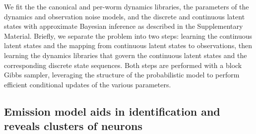 \documentclass[11pt]{article}
\begin{document}
We fit the the canonical and per-worm dynamics libraries, the
parameters of the dynamics and observation noise models, and the
discrete and continuous latent states with approximate Bayesian
inference as described in the Supplementary Material. Briefly, we
separate the problem into two steps: learning the continuous latent
states and the mapping from continuous latent states to observations,
then learning the dynamics libraries that govern the continuous latent
states and the corresponding discrete state sequences.  Both steps are
performed with a block Gibbs sampler, leveraging the structure of the
probabilistic model to perform efficient conditional updates of the
various parameters. 

\subsection*{Emission model aids in identification and reveals clusters of neurons}
\end{document}
